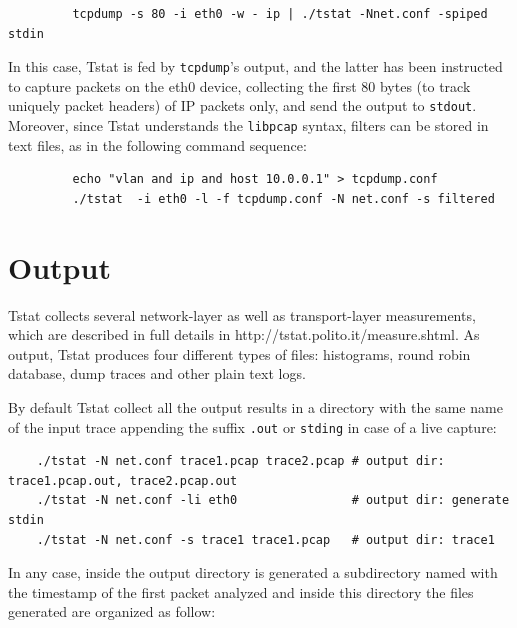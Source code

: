 \documentclass[11pt]{article}
\begin{document}
\begin{small}\begin{verbatim}
         tcpdump -s 80 -i eth0 -w - ip | ./tstat -Nnet.conf -spiped stdin
\end{verbatim}\end{small} \noindent
In this case, Tstat is fed by \texttt{tcpdump}'s output, and the latter has been
instructed to capture packets on the eth0 device, collecting the
first 80 bytes (to track uniquely packet headers) of IP packets only, 
and send the output to \texttt{stdout}. Moreover, since Tstat understands 
the \texttt{libpcap} syntax, filters can be stored in text files, as in 
the following command sequence:

\begin{small}\begin{verbatim}
         echo "vlan and ip and host 10.0.0.1" > tcpdump.conf
         ./tstat  -i eth0 -l -f tcpdump.conf -N net.conf -s filtered
\end{verbatim}\end{small} \noindent
\section{Output\label{Output}}


Tstat collects several network-layer as well as transport-layer measurements,
which are described in full details in \textsf{http://tstat.polito.it/measure.shtml}.
As output, Tstat produces four different types of files: histograms, round robin database, 
dump traces and other plain text logs.



By default Tstat collect all the output results in a directory with the same name of the input 
trace appending the suffix \texttt{.out} or \texttt{stding} in case of a live capture:

\begin{small}\begin{verbatim}
    ./tstat -N net.conf trace1.pcap trace2.pcap # output dir: trace1.pcap.out, trace2.pcap.out
    ./tstat -N net.conf -li eth0                # output dir: generate stdin   
    ./tstat -N net.conf -s trace1 trace1.pcap   # output dir: trace1
\end{verbatim}\end{small} \noindent
In any case, inside the output directory is generated a subdirectory named with the
timestamp of the first packet analyzed and inside this directory the files generated
are organized as follow:
\end{document}
